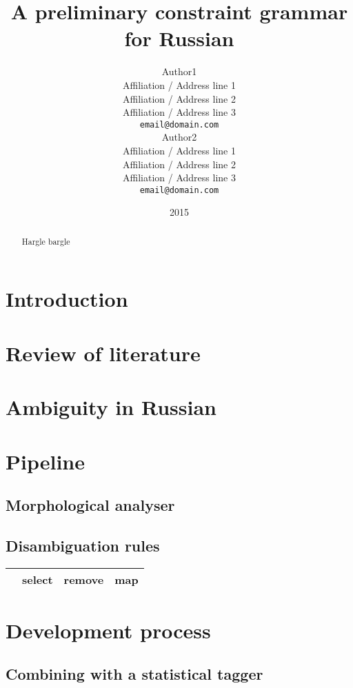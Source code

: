 \documentclass[11pt]{article}
\title{A preliminary constraint grammar for Russian}
\author{Author1 \\
  Affiliation / Address line 1 \\
  Affiliation / Address line 2 \\
  Affiliation / Address line 3 \\
  {\tt email@domain.com} \\\And
  Author2 \\
  Affiliation / Address line 1 \\
  Affiliation / Address line 2 \\
  Affiliation / Address line 3 \\
  {\tt email@domain.com} \\}
\date{2015}
\begin{document}
\maketitle
\begin{abstract}
  Hargle bargle
\end{abstract}

\section{Introduction}

\cite{Karlsson-90}

\section{Review of literature}

\section{Ambiguity in Russian}

\section{Pipeline}

\subsection{Morphological analyser}


\subsection{Disambiguation rules}

\begin{table}
  \begin{tabular}{lrrr}
    \hline
         & {\sc select} & {\sc remove} & {\sc map} \\
    \hline
  \end{tabular}
\end{table}

\section{Development process}

\subsection{Combining with a statistical tagger}
\end{document}
